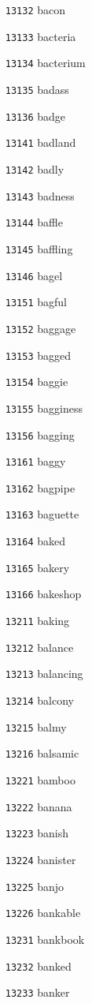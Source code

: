 \documentclass[twoside,11pt]{article}
\begin{document}
\begin{multicols}{5}
\begin{enumerate}
\item[\texttt{13132}] bacon
\item[\texttt{13133}] bacteria
\item[\texttt{13134}] bacterium
\item[\texttt{13135}] badass
\item[\texttt{13136}] badge
\item[\texttt{13141}] badland
\item[\texttt{13142}] badly
\item[\texttt{13143}] badness
\item[\texttt{13144}] baffle
\item[\texttt{13145}] baffling
\item[\texttt{13146}] bagel
\item[\texttt{13151}] bagful
\item[\texttt{13152}] baggage
\item[\texttt{13153}] bagged
\item[\texttt{13154}] baggie
\item[\texttt{13155}] bagginess
\item[\texttt{13156}] bagging
\item[\texttt{13161}] baggy
\item[\texttt{13162}] bagpipe
\item[\texttt{13163}] baguette
\item[\texttt{13164}] baked
\item[\texttt{13165}] bakery
\item[\texttt{13166}] bakeshop
\item[\texttt{13211}] baking
\item[\texttt{13212}] balance
\item[\texttt{13213}] balancing
\item[\texttt{13214}] balcony
\item[\texttt{13215}] balmy
\item[\texttt{13216}] balsamic
\item[\texttt{13221}] bamboo
\item[\texttt{13222}] banana
\item[\texttt{13223}] banish
\item[\texttt{13224}] banister
\item[\texttt{13225}] banjo
\item[\texttt{13226}] bankable
\item[\texttt{13231}] bankbook
\item[\texttt{13232}] banked
\item[\texttt{13233}] banker

\end{enumerate}
\end{multicols}
\end{document}
